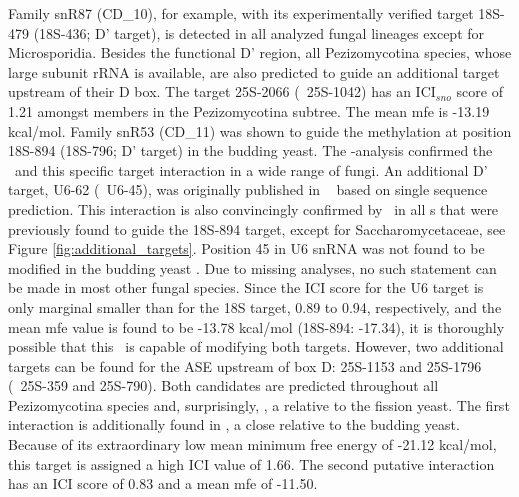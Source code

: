 Family snR87 (CD\_10), for example, with its experimentally verified target 18S-479
(18S-436; D' target), is detected in all analyzed fungal
lineages except for Microsporidia. Besides the functional D' region,
all Pezizomycotina species, whose large subunit rRNA is available, are
also predicted to guide an additional target upstream of their D
box. The target 25S-2066 (\ncr\ 25S-1042) has an ICI$_{sno}$ score of
1.21 amongst members in the Pezizomycotina subtree. The mean mfe is -13.19 kcal/mol.
Family snR53 (CD\_11) was shown to guide the methylation at position 18S-894 
(18S-796; D' target) in the budding yeast. The \snostrip-analysis
confirmed the \sno\ and this specific target interaction in a wide
range of fungi. An additional D' target, U6-62 (\sce\ U6-45), was
originally published in \ncr\ \cite{Liu:2009} based on single sequence
prediction. This interaction is also convincingly 
confirmed by \snostrip\ in all \sno s that were previously found to guide the
18S-894 target, except for Saccharomycetaceae, see Figure
\ref{fig:additional_targets}. Position 45 in U6 snRNA was not found to
be modified in the budding yeast
\cite{Machnicka:2013, Massenet:1998}. Due to missing analyses, no such
statement can be made in most other
fungal species. Since the ICI score for the U6 target is only marginal
smaller than for the 18S target, 0.89 to 0.94, respectively, and the
mean mfe value is found to be -13.78 kcal/mol (18S-894: -17.34), it is
thoroughly possible that this \sno\ is capable of modifying both
targets. However, two additional targets can be found for
the ASE upstream of box D: 25S-1153 and 25S-1796 (\ncr\ 25S-359 and
25S-790). Both candidates are predicted throughout all Pezizomycotina
species and, surprisingly, \Tde, a relative to the fission yeast. The
first interaction is additionally found in \Yli, a close
relative to the budding yeast. Because of its extraordinary low mean
minimum free energy of -21.12 kcal/mol, this target is assigned a high
ICI value of 1.66. The second putative interaction has an ICI score of
0.83 and a mean mfe of -11.50.

